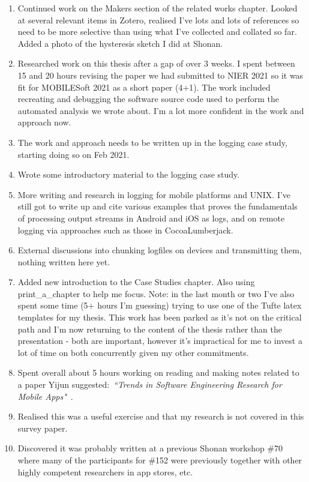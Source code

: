 \begin{enumerate}
    \item Continued work on the Makers section of the related works chapter. Looked at several relevant items in Zotero, realised I've lots and lots of references so need to be more selective than using what I've collected and collated so far. Added a photo of the hysteresis sketch I did at Shonan.
    \item Researched work on this thesis after a gap of over 3 weeks. I spent between 15 and 20 hours revising the paper we had submitted to NIER 2021 so it was fit for MOBILESoft 2021 as a short paper (4+1). The work included recreating and debugging the software source code used to perform the automated analysis we wrote about. I'm a lot more confident in the work and approach now. 
    \item The work and approach needs to be written up in the logging case study, starting doing so on  Feb 2021.
    \item Wrote some introductory material to the logging case study.
    \item More writing and research in logging for mobile platforms and UNIX. I've still got to write up and cite various examples that proves the fundamentals of processing output streams in Android and iOS as logs, and on remote logging via approaches such as those in CocoaLumberjack.
    \item External discussions into chunking logfiles on devices and transmitting them, nothing written here yet.
    \item Added new introduction to the Case Studies chapter. Also using print\_a\_chapter to help me focus. Note: in the last month or two I've also spent some time (5+ hours I'm guessing) trying to use one of the Tufte latex templates for my thesis. This work has been parked as it's not on the critical path and I'm now returning to the content of the thesis rather than the presentation - both are important, however it's impractical for me to invest a lot of time on both concurrently given my other commitments.  
    \item Spent overall about 5 hours working on reading and making notes related to a paper Yijun suggested:~\emph{``Trends in Software Engineering Research for Mobile Apps"}~\citep{nagappan2016_future_trends_in_sw_eng_for_mobile_apps}.
    \item Realised this was a useful exercise and that my research is not covered in this survey paper.
    \item Discovered it was probably written at a previous Shonan workshop \#70 where many of the participants for \#152 were previously together with other highly competent researchers in app stores, etc.

\end{enumerate}
